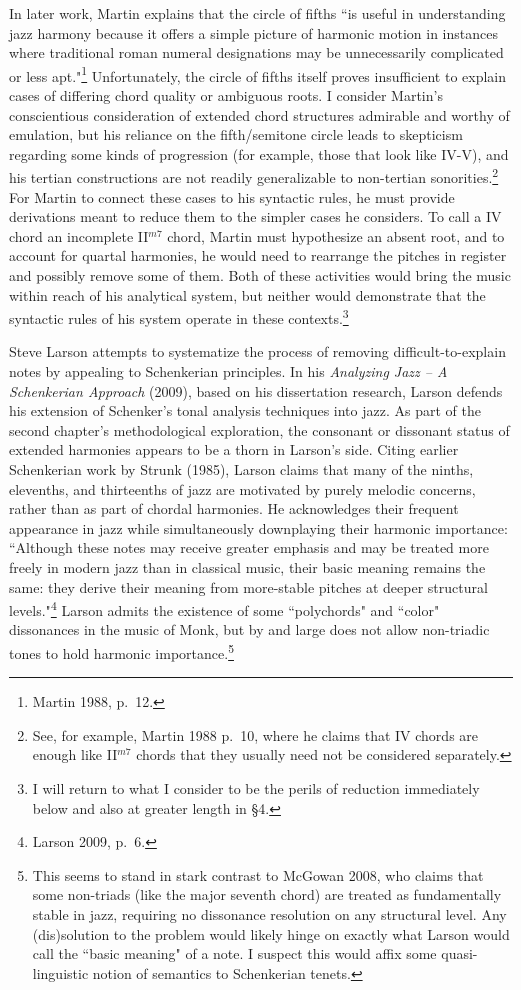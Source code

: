 In later work, Martin explains that the circle of fifths ``is useful in understanding jazz harmony because it offers a simple picture of harmonic motion in instances where traditional roman numeral designations may be unnecessarily complicated or less apt."\footnote{Martin 1988, p.\ 12.}  Unfortunately, the circle of fifths itself proves insufficient to explain cases of differing chord quality or ambiguous roots.  I consider Martin's conscientious consideration of extended chord structures admirable and worthy of emulation, but his reliance on the fifth/semitone circle leads to skepticism regarding some kinds of progression (for example, those that look like IV-V), and his tertian constructions are not readily generalizable to non-tertian sonorities.\footnote{See, for example, Martin 1988 p.\ 10, where he claims that IV chords are enough like II$^{m7}$ chords that they usually need not be considered separately.}  For Martin to connect these cases to his syntactic rules, he must provide derivations meant to reduce them to the simpler cases he considers.  To call a IV chord an incomplete II$^{m7}$ chord, Martin must hypothesize an absent root, and to account for quartal harmonies, he would need to rearrange the pitches in register and possibly remove some of them.  Both of these activities would bring the music within reach of his analytical system, but neither would demonstrate that the syntactic rules of his system operate in these contexts.\footnote{I will return to what I consider to be the perils of reduction immediately below and also at greater length in \S 4.}

Steve Larson attempts to systematize the process of removing difficult-to-explain notes by appealing to Schenkerian principles.  In his \emph{Analyzing Jazz -- A Schenkerian Approach} (2009), based on his dissertation research, Larson defends his extension of Schenker's tonal analysis techniques into jazz.  As part of the second chapter's methodological exploration, the consonant or dissonant status of extended harmonies appears to be a thorn in Larson's side.  Citing earlier Schenkerian work by Strunk (1985), Larson claims that many of the ninths, elevenths, and thirteenths of jazz are motivated by purely melodic concerns, rather than as part of chordal harmonies.  He acknowledges their frequent appearance in jazz while simultaneously downplaying their harmonic importance: ``Although these notes may receive greater emphasis and may be treated more freely in modern jazz than in classical music, their basic meaning remains the same: they derive their meaning from more-stable pitches at deeper structural levels."\footnote{Larson 2009, p.\ 6.}  Larson admits the existence of some ``polychords" and ``color" dissonances in the music of Monk, but by and large does not allow non-triadic tones to hold harmonic importance.\footnote{This seems to stand in stark contrast to McGowan 2008, who claims that some non-triads (like the major seventh chord) are treated as fundamentally stable in jazz, requiring no dissonance resolution on any structural level.  Any (dis)solution to the problem would likely hinge on exactly what Larson would call the ``basic meaning" of a note.  I suspect this would affix some quasi-linguistic notion of semantics to Schenkerian tenets.}

